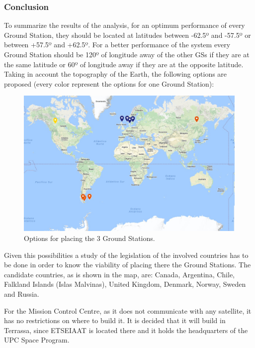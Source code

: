 \subsubsection{Conclusion}
To summarize the results of the analysis, for an optimum performance of every Ground Station, they should be located at latitudes between -62.5º and -57.5º or between +57.5º and +62.5º. For a better performance of the system every Ground Station should be 120º of longitude away of the other GSs if they are at the same latitude or 60º of longitude away if they are at the opposite latitude. Taking in account the topography of the Earth, the following options are proposed (every color represent the options for one Ground Station):
\begin{figure}[H]
\begin{center}
\includegraphics[scale=0.5]{Options.jpg}
\caption{Options for placing the 3 Ground Stations.}
\end{center}
\end{figure}

Given this possibilities a study of the legislation of the involved countries has to be done in order to know the viability of placing there the Ground Stations. The candidate countries, as is shown in the map, are: Canada, Argentina, Chile, Falkland Islands (Islas Malvinas), United Kingdom, Denmark, Norway, Sweden and Russia. 

For the Mission Control Centre, as it does not communicate with any satellite, it has no restrictions on where to build it. It is decided that it will build in Terrassa, since ETSEIAAT is located there and it holds the headquarters of the UPC Space Program.